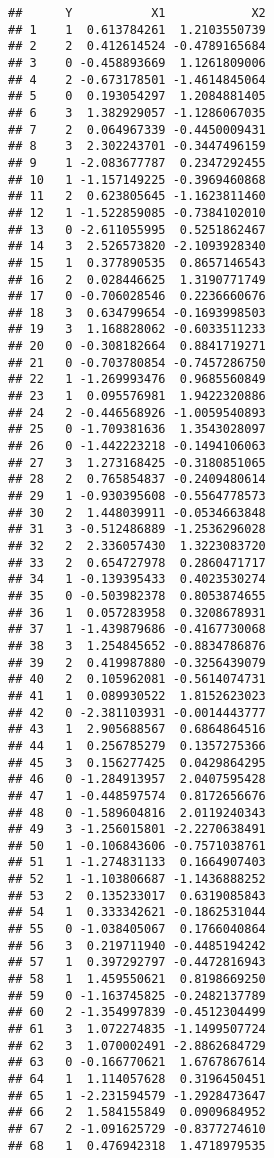 \documentclass[
]{article}
\begin{document}
\begin{verbatim}
##      Y           X1            X2
## 1    1  0.613784261  1.2103550739
## 2    2  0.412614524 -0.4789165684
## 3    0 -0.458893669  1.1261809006
## 4    2 -0.673178501 -1.4614845064
## 5    0  0.193054297  1.2084881405
## 6    3  1.382929057 -1.1286067035
## 7    2  0.064967339 -0.4450009431
## 8    3  2.302243701 -0.3447496159
## 9    1 -2.083677787  0.2347292455
## 10   1 -1.157149225 -0.3969460868
## 11   2  0.623805645 -1.1623811460
## 12   1 -1.522859085 -0.7384102010
## 13   0 -2.611055995  0.5251862467
## 14   3  2.526573820 -2.1093928340
## 15   1  0.377890535  0.8657146543
## 16   2  0.028446625  1.3190771749
## 17   0 -0.706028546  0.2236660676
## 18   3  0.634799654 -0.1693998503
## 19   3  1.168828062 -0.6033511233
## 20   0 -0.308182664  0.8841719271
## 21   0 -0.703780854 -0.7457286750
## 22   1 -1.269993476  0.9685560849
## 23   1  0.095576981  1.9422320886
## 24   2 -0.446568926 -1.0059540893
## 25   0 -1.709381636  1.3543028097
## 26   0 -1.442223218 -0.1494106063
## 27   3  1.273168425 -0.3180851065
## 28   2  0.765854837 -0.2409480614
## 29   1 -0.930395608 -0.5564778573
## 30   2  1.448039911 -0.0534663848
## 31   3 -0.512486889 -1.2536296028
## 32   2  2.336057430  1.3223083720
## 33   2  0.654727978  0.2860471717
## 34   1 -0.139395433  0.4023530274
## 35   0 -0.503982378  0.8053874655
## 36   1  0.057283958  0.3208678931
## 37   1 -1.439879686 -0.4167730068
## 38   3  1.254845652 -0.8834786876
## 39   2  0.419987880 -0.3256439079
## 40   2  0.105962081 -0.5614074731
## 41   1  0.089930522  1.8152623023
## 42   0 -2.381103931 -0.0014443777
## 43   1  2.905688567  0.6864864516
## 44   1  0.256785279  0.1357275366
## 45   3  0.156277425  0.0429864295
## 46   0 -1.284913957  2.0407595428
## 47   1 -0.448597574  0.8172656676
## 48   0 -1.589604816  2.0119240343
## 49   3 -1.256015801 -2.2270638491
## 50   1 -0.106843606 -0.7571038761
## 51   1 -1.274831133  0.1664907403
## 52   1 -1.103806687 -1.1436888252
## 53   2  0.135233017  0.6319085843
## 54   1  0.333342621 -0.1862531044
## 55   0 -1.038405067  0.1766040864
## 56   3  0.219711940 -0.4485194242
## 57   1  0.397292797 -0.4472816943
## 58   1  1.459550621  0.8198669250
## 59   0 -1.163745825 -0.2482137789
## 60   2 -1.354997839 -0.4512304499
## 61   3  1.072274835 -1.1499507724
## 62   3  1.070002491 -2.8862684729
## 63   0 -0.166770621  1.6767867614
## 64   1  1.114057628  0.3196450451
## 65   1 -2.231594579 -1.2928473647
## 66   2  1.584155849  0.0909684952
## 67   2 -1.091625729 -0.8377274610
## 68   1  0.476942318  1.4718979535

\end{verbatim}
\end{document}
